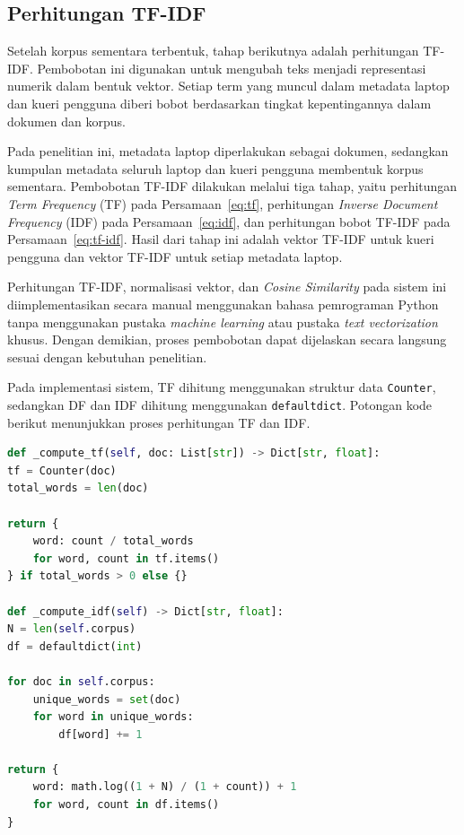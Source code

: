 \subsection{Perhitungan TF-IDF}
Setelah korpus sementara terbentuk, tahap berikutnya adalah perhitungan TF-IDF. Pembobotan ini digunakan untuk mengubah teks menjadi representasi numerik dalam bentuk vektor. Setiap term yang muncul dalam metadata laptop dan kueri pengguna diberi bobot berdasarkan tingkat kepentingannya dalam dokumen dan korpus.

Pada penelitian ini, metadata laptop diperlakukan sebagai dokumen, sedangkan kumpulan metadata seluruh laptop dan kueri pengguna membentuk korpus sementara. Pembobotan TF-IDF dilakukan melalui tiga tahap, yaitu perhitungan \textit{Term Frequency} (TF) pada Persamaan~\ref{eq:tf}, perhitungan \textit{Inverse Document Frequency} (IDF) pada Persamaan~\ref{eq:idf}, dan perhitungan bobot TF-IDF pada Persamaan~\ref{eq:tf-idf}. Hasil dari tahap ini adalah vektor TF-IDF untuk kueri pengguna dan vektor TF-IDF untuk setiap metadata laptop.

Perhitungan TF-IDF, normalisasi vektor, dan \textit{Cosine Similarity} pada sistem ini diimplementasikan secara manual menggunakan bahasa pemrograman Python tanpa menggunakan pustaka \textit{machine learning} atau pustaka \textit{text vectorization} khusus. Dengan demikian, proses pembobotan dapat dijelaskan secara langsung sesuai dengan kebutuhan penelitian.

Pada implementasi sistem, TF dihitung menggunakan struktur data \texttt{Counter}, sedangkan DF dan IDF dihitung menggunakan \texttt{defaultdict}. Potongan kode berikut menunjukkan proses perhitungan TF dan IDF.

\begin{lstlisting}[basicstyle=\linespread{0.8}\ttfamily\footnotesize, language=Python, breaklines=true, caption={Potongan Kode Perhitungan TF dan IDF}, label=kode:perhitungan_tf_idf]
def _compute_tf(self, doc: List[str]) -> Dict[str, float]:
tf = Counter(doc)
total_words = len(doc)

return {
    word: count / total_words
    for word, count in tf.items()
} if total_words > 0 else {}

def _compute_idf(self) -> Dict[str, float]:
N = len(self.corpus)
df = defaultdict(int)

for doc in self.corpus:
    unique_words = set(doc)
    for word in unique_words:
        df[word] += 1

return {
    word: math.log((1 + N) / (1 + count)) + 1
    for word, count in df.items()
}
\end{lstlisting}

